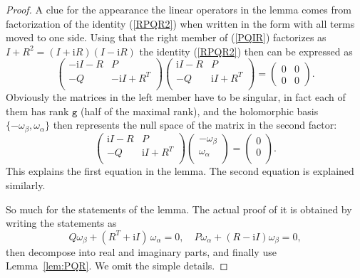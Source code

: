 \documentclass[reqno,12pt]{article}
\theoremstyle{plain}
\theoremstyle{definition}
\numberwithin{equation}{section}
\numberwithin{figure}{section}
\def\I{\mathrm{i}}
\begin{document}
\begin{proof}
A clue for the appearance the linear operators in the lemma comes from
factorization of the identity (\ref{RPQR2}) when written in the form with all terms moved to one side.
Using that the right member of (\ref{PQIR}) factorizes as $I+R^2=(I+\I R)(I-\I R)$ the identity (\ref{RPQR2})
then can be  expressed as
$$
\left( \begin{array}{cc}
                                            -\I I-R & P  \\
                                              -Q & -\I I+R^T \\
\end{array} \right)
\left( \begin{array}{cc}
                                          \I I  -R & P  \\
                                              -Q &\I I+ R^T \\
\end{array} \right)
=
\left( \begin{array}{cc}
                                            0 &0 \\
                                             0  &0 
\end{array} \right).
$$
Obviously the matrices in the left member have to be singular, 
in fact each of them has rank $\texttt{g}$ (half of the maximal rank), and the holomorphic basis 
$\{-\omega_\beta, \omega_\alpha\}$ then represents the null space
of the matrix in the second factor:
$$
\left( \begin{array}{cc}
                                          \I I  -R & P  \\
                                              -Q &\I I+ R^T \\
\end{array} \right)
\left( \begin{array}{cc}
                                     -\omega_\beta \\
                                      \omega_\alpha \\
\end{array} \right)
=
\left( \begin{array}{c}
                                            0  \\
                                             0   \\
\end{array} \right).
$$
This explains the first equation in the lemma. The second equation is explained similarly.

So much for the statements of the lemma.  The actual proof of it is obtained by writing the statements as
$$
Q\omega_\beta+(R^T+\I I )\,\omega_\alpha=0,
\quad P\omega_\alpha+(R-\I I)\omega_\beta=0,
$$
then decompose into real and imaginary parts, and finally use Lemma~\ref{lem:PQR}.
We omit the simple details.
\end{proof}
\end{document}
